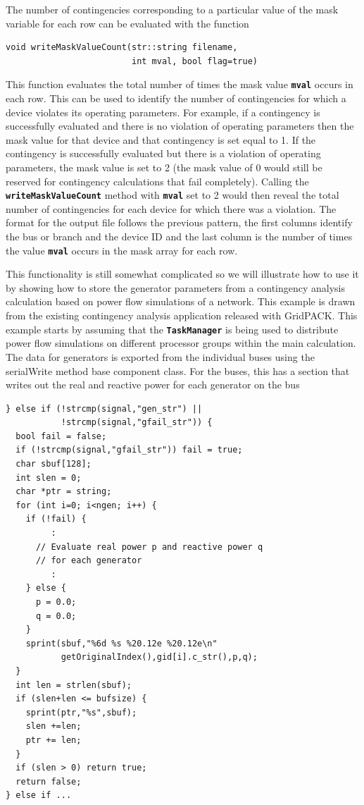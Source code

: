The number of contingencies corresponding to a particular value of the mask variable for each row can be evaluated with the function

{
\color{red}
\begin{Verbatim}[fontseries=b]
void writeMaskValueCount(str::string filename,
                         int mval, bool flag=true)
\end{Verbatim}
}

This function evaluates the total number of times the mask value \texttt{\textbf{mval}} occurs in each row. This can be used to identify the number of contingencies for which a device violates its operating parameters. For example, if a contingency is successfully evaluated and there is no violation of operating parameters then the mask value for that device and that contingency is set equal to 1. If the contingency is successfully evaluated but there is a violation of operating parameters, the mask value is set to 2 (the mask value of 0 would still be reserved for contingency calculations that fail completely). Calling the \texttt{\textbf{writeMaskValueCount}} method with \texttt{\textbf{mval}} set to 2 would then reveal the total number of contingencies for each device for which there was a violation. The format for the output file follows the previous pattern, the first columns identify the bus or branch and the device ID and the last column is the number of times the value \texttt{\textbf{mval}} occurs in the mask array for each row.

This functionality is still somewhat complicated so we will illustrate how to use it by showing how to store the generator parameters from a contingency analysis calculation based on power flow simulations of a network. This example is drawn from the existing contingency analysis application released with GridPACK. This example starts by assuming that the \texttt{\textbf{TaskManager}} is being used to distribute power flow simulations on different processor groups within the main calculation. The data for generators is exported from the individual buses using the serialWrite method base component class. For the buses, this has a section that writes out the real and reactive power for each generator on the bus

{
\color{red}
\begin{Verbatim}[fontseries=b]
} else if (!strcmp(signal,"gen_str") ||
           !strcmp(signal,"gfail_str")) {
  bool fail = false;
  if (!strcmp(signal,"gfail_str")) fail = true;
  char sbuf[128];
  int slen = 0;  
  char *ptr = string;  
  for (int i=0; i<ngen; i++) {
    if (!fail) {
         :
      // Evaluate real power p and reactive power q
      // for each generator
         :
    } else {
      p = 0.0;
      q = 0.0;
    }
    sprint(sbuf,"%6d %s %20.12e %20.12e\n"
           getOriginalIndex(),gid[i].c_str(),p,q);
  }
  int len = strlen(sbuf);
  if (slen+len <= bufsize) {
    sprint(ptr,"%s",sbuf);
    slen +=len;
    ptr += len;
  }
  if (slen > 0) return true;
  return false;
} else if ...

\end{Verbatim}
}

